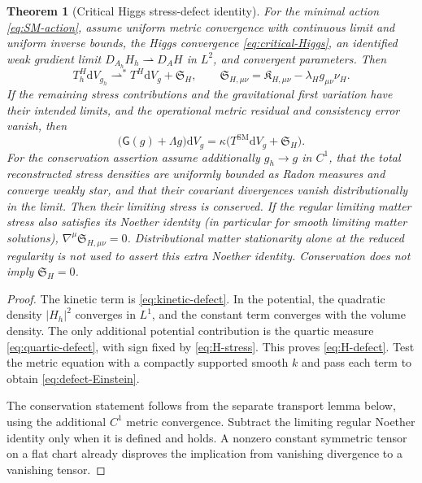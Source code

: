 \documentclass[11pt]{article}
\numberwithin{equation}{section}
\newtheorem{theorem}{Theorem}[section]
\theoremstyle{definition}
\theoremstyle{remark}
\newcommand{\dd}{\mathrm d}
\newcommand{\abs}[1]{\lvert#1\rvert}
\newcommand{\Eins}{\mathsf G}
\newcommand{\dV}{\dd V}
\begin{document}
\begin{theorem}[Critical Higgs stress-defect identity]
\label{thm:higgs-defect}
For the minimal action \eqref{eq:SM-action}, assume uniform metric convergence
with continuous limit and uniform inverse bounds, the Higgs convergence
\eqref{eq:critical-Higgs}, an identified weak gradient limit
$D_{A_h}H_h\rightharpoonup D_AH$ in $L^2$, and convergent parameters. Then
\begin{equation}
 T^H_h\dV_{g_h}\rightharpoonup^*
 T^H\dV_g+\mathfrak S_H,
 \qquad
 \mathfrak S_{H,\mu\nu}
 =\mathfrak K_{H,\mu\nu}-\lambda_Hg_{\mu\nu}\nu_H.
 \label{eq:H-defect}
\end{equation}
If the remaining stress contributions and the gravitational first variation have their intended limits, and the operational metric residual and consistency error vanish, then
\begin{equation}
 \bigl(\Eins(g)+\Lambda g\bigr)\dV_g
 =\kappa\bigl(T^{\mathrm{SM}}\dV_g+\mathfrak S_H\bigr).
 \label{eq:defect-Einstein}
\end{equation}
For the conservation assertion assume additionally $g_h\to g$ in $C^1$,
that the total reconstructed stress densities are uniformly bounded as
Radon measures and converge weakly star, and that their covariant divergences
vanish distributionally in the limit. Then their limiting stress is
conserved. If the regular limiting matter stress also satisfies its Noether
identity (in particular for smooth limiting matter solutions),
$\nabla^\mu\mathfrak S_{H,\mu\nu}=0$. Distributional matter stationarity
alone at the reduced regularity is not used to assert this extra Noether
identity. Conservation does not imply $\mathfrak S_H=0$.
\end{theorem}
\begin{proof}
The kinetic term is \eqref{eq:kinetic-defect}. In the potential, the quadratic density $\abs{H_h}^2$ converges in $L^1$, and the constant term converges with the volume density. The only additional potential contribution is the quartic measure \eqref{eq:quartic-defect}, with sign fixed by \eqref{eq:H-stress}. This proves \eqref{eq:H-defect}. Test the metric equation with a compactly supported smooth $k$ and pass each term to obtain \eqref{eq:defect-Einstein}.

The conservation statement follows from the separate transport lemma below,
using the additional $C^1$ metric convergence. Subtract the limiting regular
Noether identity only when it is defined and holds. A nonzero constant
symmetric tensor on a flat chart already disproves the implication from
vanishing divergence to a vanishing tensor.
\end{proof}
\end{document}
